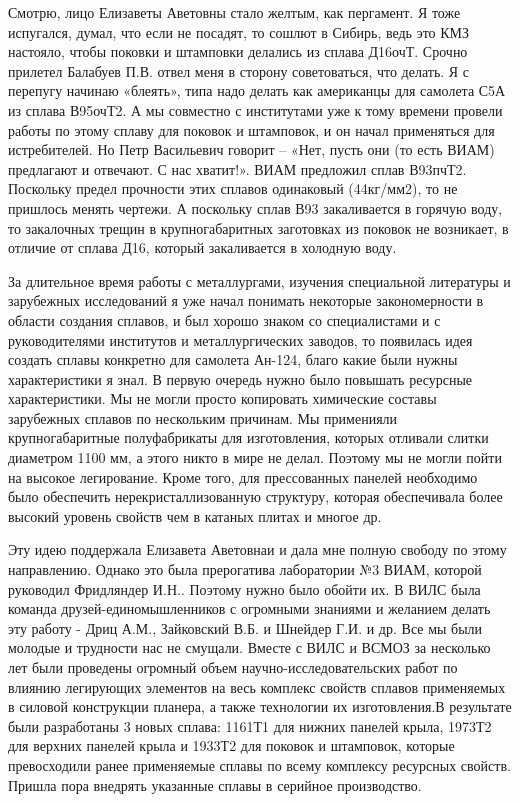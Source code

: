 
Смотрю, лицо Елизаветы Аветовны стало желтым, как пергамент. Я тоже испугался,
думал, что если не посадят, то сошлют в Сибирь, ведь это КМЗ настояло, чтобы
поковки и штамповки делались из сплава Д16очТ. Срочно прилетел Балабуев П.В.
отвел меня в сторону советоваться, что делать. Я с перепугу начинаю «блеять»,
типа надо делать как американцы для самолета С5А из сплава В95очТ2. А мы
совместно с институтами уже к тому времени провели работы по этому сплаву для
поковок и штамповок, и он начал применяться для истребителей. Но Петр
Васильевич говорит – «Нет, пусть они (то есть ВИАМ) предлагают и отвечают. С
нас хватит!». ВИАМ предложил сплав В93пчТ2. Поскольку предел прочности этих
сплавов одинаковый (44кг/мм2), то не пришлось менять чертежи. А поскольку сплав
В93 закаливается в горячую воду, то закалочных трещин в крупногабаритных
заготовках из поковок не возникает, в отличие от сплава Д16, который
закаливается в холодную воду.

За длительное время работы с металлургами, изучения специальной литературы и
зарубежных исследований я уже начал понимать некоторые закономерности в области
создания сплавов, и был хорошо знаком со специалистами и с руководителями
институтов и металлургических заводов, то появилась идея создать сплавы
конкретно для самолета Ан-124, благо какие были нужны характеристики я знал. В
первую очередь нужно было повышать ресурсные характеристики. Мы не могли просто
копировать химические составы зарубежных сплавов по нескольким причинам. Мы
применияли крупногабаритные полуфабрикаты для изготовления, которых отливали
слитки диаметром 1100 мм, а этого никто в мире не делал. Поэтому мы не могли
пойти на высокое легирование. Кроме того, для прессованных панелей необходимо
было обеспечить нерекристаллизованную структуру, которая обеспечивала более
высокий уровень свойств чем в катаных плитах и многое др.

Эту идею поддержала Елизавета Аветовнаи и дала мне полную свободу по этому
направлению. Однако это была прерогатива лаборатории №3 ВИАМ, которой руководил
Фридляндер И.Н.. Поэтому нужно было обойти их. В ВИЛС была команда
друзей-единомышленников с огромными знаниями и желанием делать эту работу -
Дриц А.М., Зайковский В.Б. и Шнейдер Г.И. и др. Все мы были молодые и трудности
нас не смущали. Вместе с ВИЛС и ВСМОЗ за несколько лет были проведены огромный
объем научно-исследовательских работ по влиянию легирующих элементов на весь
комплекс свойств сплавов применяемых в силовой конструкции планера, а также
технологии их изготовления.В результате были разработаны 3 новых сплава: 1161Т1
для нижних панелей крыла, 1973Т2 для верхних панелей крыла и 1933Т2 для поковок
и штамповок, которые превосходили ранее применяемые сплавы по всему комплексу
ресурсных свойств. Пришла пора внедрять указанные сплавы в серийное
производство.

